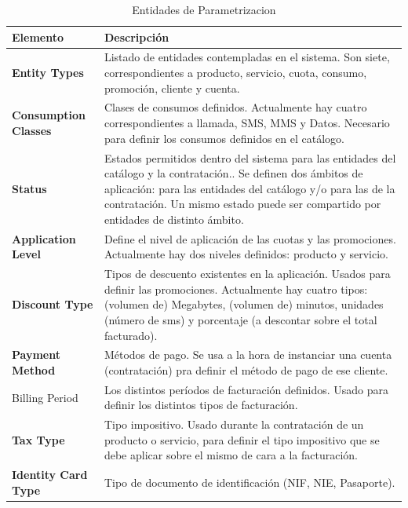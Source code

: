 \begin{table}[H]
  \centering
  \setlength{\leftmargini}{0.4cm}
  \resizebox{14cm}{!} {
  \begin{tabular}{|m{3cm} m{11cm}|}
  \rowcolor{udcpink!25}
  \hline
  	\textbf{Elemento} & \textbf{Descripción} \\\hline
	\textbf{Entity Types} & Listado de entidades contempladas en el sistema. Son siete, correspondientes a producto, servicio, cuota, consumo, promoción, cliente y cuenta.   \\
	\textbf{Consumption Classes} & Clases de consumos definidos. Actualmente hay cuatro correspondientes a llamada, SMS, MMS y Datos. Necesario para definir los consumos definidos en el catálogo. \\
	\textbf{Status} & Estados permitidos dentro del sistema para las entidades del catálogo y la contratación.. Se definen dos ámbitos de aplicación: para las entidades del catálogo y/o para las de la contratación. Un mismo estado puede ser compartido por entidades de distinto ámbito. \\
	\textbf{Application Level} & Define el nivel de aplicación de las cuotas y las promociones. Actualmente hay dos niveles definidos: producto y servicio.  \\
	\textbf{Discount Type} & Tipos de descuento existentes en la aplicación. Usados para definir las promociones. Actualmente hay cuatro tipos: (volumen de) Megabytes, (volumen de) minutos, unidades (número de sms) y porcentaje (a descontar sobre el total facturado).   \\
	\textbf{Payment Method} & Métodos de pago. Se usa a la hora de instanciar una cuenta (contratación) pra definir el método de pago de ese cliente. \\
Billing Period & Los distintos períodos de facturación definidos. Usado para definir los distintos tipos de facturación. \\
	\textbf{Tax Type} & Tipo impositivo. Usado durante la contratación de un producto o servicio, para definir el tipo impositivo que se debe aplicar sobre el mismo de cara a la facturación.\\
	\textbf{Identity Card Type} & Tipo de documento de identificación (NIF, NIE, Pasaporte).
	\\\hline
  \end{tabular}
  } %
  \caption{Entidades de Parametrizacion}
  \label{tab:parametrizacion}
\end{table}

